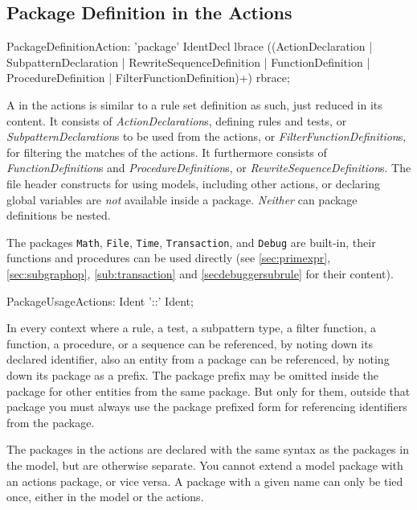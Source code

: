 \subsection{Package Definition in the Actions}\label{sub:packageaction} 

\begin{rail}
  PackageDefinitionAction: 'package' IdentDecl lbrace ((ActionDeclaration | SubpatternDeclaration | RewriteSequenceDefinition | FunctionDefinition | ProcedureDefinition | FilterFunctionDefinition)+) rbrace;
\end{rail}

A  in the actions is similar to a rule set definition as such, just reduced in its content.
It consists of \emph{ActionDeclaration}s, defining rules and tests, or \emph{SubpatternDeclaration}s to be used from the actions, or \emph{FilterFunctionDefinition}s, for filtering the matches of the actions.
It furthermore consists of \emph{FunctionDefinition}s and \emph{ProcedureDefinition}s, or \emph{RewriteSequenceDefinition}s. 
The file header constructs for using models, including other actions, or declaring global variables are \emph{not} available inside a package.
\emph{Neither} can package definitions be nested.

The packages \texttt{Math}, \texttt{File}, \texttt{Time}, \texttt{Transaction}, and \texttt{Debug} are built-in, their functions and procedures can be used directly (see \ref{sec:primexpr}, \ref{sec:subgraphop}, \ref{sub:transaction} and \ref{secdebuggersubrule} for their content).

\begin{rail}
  PackageUsageActions: Ident '::' Ident;
\end{rail}

In every context where a rule, a test, a subpattern type, a filter function, a function, a procedure, or a sequence can be referenced, by noting down its declared identifier, 
also an entity from a package can be referenced,
by noting down its package as a prefix.
The package prefix may be omitted inside the package for other entities from the same package.
But only for them, outside that package you must always use the package prefixed form for referencing identifiers from the package.

The packages in the actions are declared with the same syntax as the packages in the model, but are otherwise separate. 
You cannot extend a model package with an actions package, or vice versa.
A package with a given name can only be tied once, either in the model or the actions.

